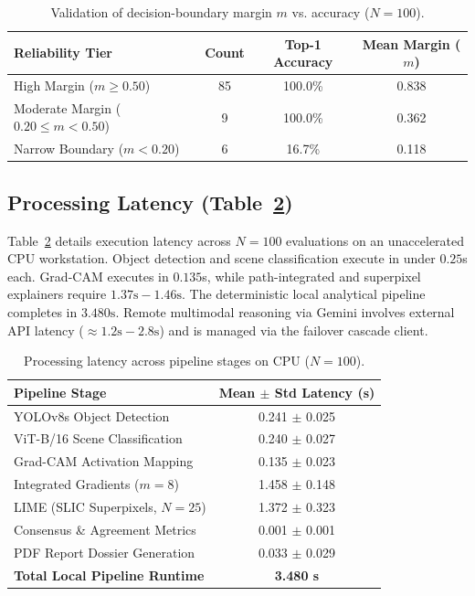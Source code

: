\documentclass[journal,10pt,twocolumn]{IEEEtran}
\begin{document}
\begin{table}[t]
\centering
\caption{Validation of decision-boundary margin $m$ vs. accuracy ($N=100$).}
\label{tab:reliability}
\begin{tabular}{lccc}
\toprule
\textbf{Reliability Tier} & \textbf{Count} & \textbf{Top-1 Accuracy} & \textbf{Mean Margin ($m$)} \\
\midrule
High Margin ($m \ge 0.50$) & 85 & 100.0\% & 0.838 \\
Moderate Margin ($0.20 \le m < 0.50$) & 9 & 100.0\% & 0.362 \\
Narrow Boundary ($m < 0.20$) & 6 & 16.7\% & 0.118 \\
\bottomrule
\end{tabular}
\end{table}

\subsection{Processing Latency (Table~\ref{tab:latency})}
Table~\ref{tab:latency} details execution latency across $N=100$ evaluations on an unaccelerated CPU workstation. Object detection and scene classification execute in under $0.25$s each. Grad-CAM executes in $0.135$s, while path-integrated and superpixel explainers require $1.37\text{s} - 1.46\text{s}$. The deterministic local analytical pipeline completes in $3.480\text{s}$. Remote multimodal reasoning via Gemini involves external API latency ($\approx 1.2\text{s} - 2.8\text{s}$) and is managed via the failover cascade client.

\begin{table}[t]
\centering
\caption{Processing latency across pipeline stages on CPU ($N=100$).}
\label{tab:latency}
\begin{tabular}{lc}
\toprule
\textbf{Pipeline Stage} & \textbf{Mean $\pm$ Std Latency (s)} \\
\midrule
YOLOv8s Object Detection & 0.241 $\pm$ 0.025 \\
ViT-B/16 Scene Classification & 0.240 $\pm$ 0.027 \\
Grad-CAM Activation Mapping & 0.135 $\pm$ 0.023 \\
Integrated Gradients ($m=8$) & 1.458 $\pm$ 0.148 \\
LIME (SLIC Superpixels, $N=25$) & 1.372 $\pm$ 0.323 \\
Consensus \& Agreement Metrics & 0.001 $\pm$ 0.001 \\
PDF Report Dossier Generation & 0.033 $\pm$ 0.029 \\
\midrule
\textbf{Total Local Pipeline Runtime} & \textbf{3.480 s} \\
\bottomrule
\end{tabular}
\end{table}
\end{document}
